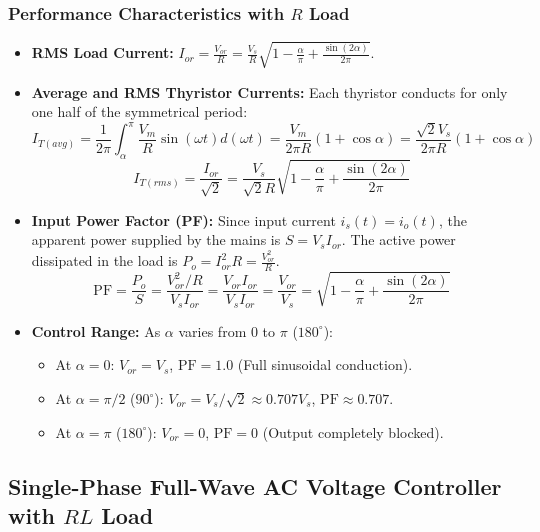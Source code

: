 \documentclass[11pt,a4paper]{article}
\let\origsubsection\subsection
\renewcommand{\subsection}{\Needspace{7\baselineskip}\origsubsection}
\begin{document}
\subsubsection{Performance Characteristics with $R$ Load}
\begin{itemize}[leftmargin=*]
  \item \textbf{RMS Load Current:} $I_{or} = \frac{V_{or}}{R} = \frac{V_s}{R} \sqrt{1 - \frac{\alpha}{\pi} + \frac{\sin(2\alpha)}{2\pi}}$.
  \item \textbf{Average and RMS Thyristor Currents:} Each thyristor conducts for only one half of the symmetrical period:
  \begin{equation}
  I_{T(avg)} = \frac{1}{2\pi} \int_{\alpha}^{\pi} \frac{V_m}{R}\sin(\omega t) d(\omega t) = \frac{V_m}{2\pi R} (1 + \cos\alpha) = \frac{\sqrt{2}V_s}{2\pi R}(1 + \cos\alpha)
  \end{equation}
  \begin{equation}
  I_{T(rms)} = \frac{I_{or}}{\sqrt{2}} = \frac{V_s}{\sqrt{2}R} \sqrt{1 - \frac{\alpha}{\pi} + \frac{\sin(2\alpha)}{2\pi}}
  \end{equation}
  \item \textbf{Input Power Factor (PF):} Since input current $i_s(t) = i_o(t)$, the apparent power supplied by the mains is $S = V_s I_{or}$. The active power dissipated in the load is $P_o = I_{or}^2 R = \frac{V_{or}^2}{R}$.
  \begin{equation}
  \text{PF} = \frac{P_o}{S} = \frac{V_{or}^2 / R}{V_s I_{or}} = \frac{V_{or} I_{or}}{V_s I_{or}} = \frac{V_{or}}{V_s} = \sqrt{1 - \frac{\alpha}{\pi} + \frac{\sin(2\alpha)}{2\pi}}
  \end{equation}
  \item \textbf{Control Range:} As $\alpha$ varies from $0$ to $\pi$ ($180^\circ$):
  \begin{itemize}
    \item At $\alpha = 0$: $V_{or} = V_s$, $\text{PF} = 1.0$ (Full sinusoidal conduction).
    \item At $\alpha = \pi/2$ ($90^\circ$): $V_{or} = V_s / \sqrt{2} \approx 0.707 V_s$, $\text{PF} \approx 0.707$.
    \item At $\alpha = \pi$ ($180^\circ$): $V_{or} = 0$, $\text{PF} = 0$ (Output completely blocked).
  \end{itemize}
\end{itemize}

\subsection{Single-Phase Full-Wave AC Voltage Controller with $RL$ Load}
\end{document}
